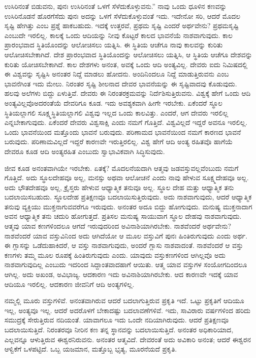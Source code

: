 ಉಸಿರಿನಂತೆ ಬಿಡುವನು, ಪುನಃ ಉಸಿರಿನಂತೆ ಒಳಗೆ ಸೆಳೆದುಕೊಳ್ಳುವನು.” ನಾವು ಒಂದು ಧೂಳಿನ ಕಣವನ್ನು ಉಸಿರಿನೊಡನೆ ಹೊರಗೆಸೆದು ಪುನಃ ಅದನ್ನು ಒಳಗೆ ಸೆಳೆದುಕೊಳ್ಳುವಂತೆ ಇದು. ಇದೇನೋ ಸರಿ, ಆದರೆ ಮೊದಲ ಸೃಷ್ಟಿ ಹೇಗಿತ್ತು ಎಂಬ ಪ್ರಶ್ನೆ ಹಾಕಬಹುದು. ಇದಕ್ಕೆ ಉತ್ತರವೆ, ಪ್ರಥಮ ಸೃಷ್ಟಿ ಎಂದರೆ ಅರ್ಥವೇನು? ಪ್ರಥಮಸೃಷ್ಟಿ ಎಂಬುದೇ ಇರಲಿಲ್ಲ. ಕಾಲಕ್ಕೆ ಒಂದು ಆದಿಯನ್ನು ನೀವು ಕೊಟ್ಟರೆ ಕಾಲದ ಭಾವನೆಯೆ ನಾಶವಾಗುವುದು. ಕಾಲ ಪ್ರಾರಂಭವಾದ ಸ್ಥಿತಿಯೊಂದನ್ನು ಆಲೋಚಿಸಲು ಯತ್ನಿಸಿ. ಈ ಸ್ಥಿತಿಯ ಆಚೆಗೂ ನಾವು ಕಾಲವನ್ನು ಕುರಿತು ಆಲೋಚಿಸಬೇಕಾಗಿದೆ. ದೇಶ ಪ್ರಾರಂಭವಾದ ಸ್ಥಿತಿಯೊಂದನ್ನು ಆಲೋಚಿಸಲು ಯತ್ನಿಸಿ, ಆ ಸ್ಥಿತಿಯ ಆಚೆಗೂ ದೇಶವನ್ನು ಕುರಿತು ಯೋಚಿಸಬೇಕಾಗಿದೆ. ಕಾಲ ದೇಶಗಳು ಅನಂತ, ಅವಕ್ಕೆ ಒಂದು ಆದಿ ಅಂತ್ಯವಿಲ್ಲ. ದೇವರು ಐದು ನಿಮಿಷದಲ್ಲಿ ಈ ವಿಶ್ವವನ್ನು ಸೃಷ್ಟಿಸಿ ಅನಂತರ ನಿದ್ದೆ ಮಾಡಲು ಹೋದನು. ಅಂದಿನಿಂದಲೂ ನಿದ್ದೆ ಮಾಡುತ್ತಿರುವನು ಎಂಬ ಭಾವನೆಗಿಂತ ಇದು ಮೇಲು. ನಿರಂತರ ಸೃಷ್ಟಿ ಶೀಲನಾದ ದೇವರ ಭಾವನೆಯನ್ನು ಈ ಸೃಷ್ಟಿವಾದವು ಕೊಡುವುದು. ಹಲವು ಅಲೆಗಳು ಬಿದ್ದು ಏಳುತ್ತಿವೆ. ದೇವರು ಈ ನಿರಂತರ\break ಕ್ರಮವನ್ನು ನಿರ್ದೆಶಿಸುತ್ತಿರುವನು. ವಿಶ್ವಕ್ಕೆ ಹೇಗೆ ಒಂದು ಆದಿ ಅಂತ್ಯವಿಲ್ಲವೊ\break ಅದರಂತೆಯೆ ದೇವರಿಗೂ ಕೂಡ. ಇದು ಅವಶ್ಯಕವಾಗಿ ಹೀಗೇ ಇರಬೇಕು. ಏಕೆಂದರೆ ಸ್ಥೂಲ ಸ್ಥಿತಿಯಲ್ಲಾಗಲಿ ಸೂಕ್ಷ್ಮಸ್ಥಿತಿಯಲ್ಲಾಗಲಿ ವಿಶ್ವವು ಇಲ್ಲದ ಒಂದು ಕಾಲವಿತ್ತು. ಎಂದರೆ, ಆಗ ದೇವರು ಇರಲಿಲ್ಲ ಎನ್ನಬೇಕಾಗುವುದು. ಏಕೆಂದರೆ ದೇವರು ವಿಶ್ವಸಾಕ್ಷಿ ಎಂದು ನಮಗೆ ಗೊತ್ತಿದೆ. ವಿಶ್ವವಿಲ್ಲದೆ ಇದ್ದರೆ ಅವನೂ ಇರಲಿಲ್ಲ. ಒಂದು ಭಾವನೆಯಿಂದ ಮತ್ತೊಂದು ಭಾವನೆ ಬರುವುದು. ಪರಿಣಾಮದ ಭಾವನೆಯಿಂದ ನಮಗೆ ಕಾರಣದ ಭಾವನೆ ಬರುವುದು. ಪರಿಣಾಮವಿಲ್ಲದೆ ಇದ್ದರೆ ಕಾರಣವೇ ಇರುತ್ತಿರಲಿಲ್ಲ. ವಿಶ್ವ ಹೇಗೆ ಆದಿ ಅಂತ್ಯ ರಹಿತವೊ ಹಾಗೆಯೆ ದೇವರೂ ಕೂಡ ಆದಿ ಅಂತ್ಯರಹಿತ ಎಂಬುದು ಸ್ವಾಭಾವಿಕವಾಗಿ ಸಿದ್ಧಿಸುವುದು.

ಜೀವ ಕೂಡ ಅನಂತವಾಗಿಯೇ ಇರಬೇಕು. ಏತಕ್ಕೆ? ಮೊದಲನೆಯದಾಗಿ ಆತ್ಮವು ಜಡವಸ್ತುವಲ್ಲವೆಂಬುದು ನಮಗೆ ಗೊತ್ತಿದೆ. ಅದು ಸ್ಥೂಲದೇಹವೂ ಅಲ್ಲ, ಮನಸ್ಸು ಅಥವಾ ಆಲೋಚನೆ ಎಂದು ನಾವು ಹೇಳುವ ಸೂಕ್ಷ್ಮದೇಹವೂ ಅಲ್ಲ. ಅದು ಭೌತದೇಹವೂ ಅಲ್ಲ, ಕ್ರೈಸ್ತರು ಹೇಳುವ ಆಧ್ಯಾತ್ಮಿಕ ತನುವೂ ಅಲ್ಲ. ಸ್ಥೂಲ ದೇಹ ಮತ್ತು ಆಧ್ಯಾತ್ಮಿಕ ತನು ಬದಲಾಯಿಸಬಹುದು. ಸ್ಥೂಲದೇಹ ಪ್ರತಿಕ್ಷಣವೂ ಬದಲಾಯಿಸುತ್ತಿರುವುದು. ಅದು ನಾಶವಾಗುವುದು, ಆದರೆ ಆಧ್ಯಾತ್ಮಿಕ ತನುವು ವ್ಯಕ್ತಿಯು ಮುಕ್ತನಾಗುವವರೆಗೂ ಇರುವುದು. ಅನಂತರ ಅದೂ ಬಿದ್ದು ಹೋಗುವುದು. ಮನುಷ್ಯ ಮುಕ್ತನಾದಾಗ ಅವನ ಆಧ್ಯಾತ್ಮಿಕ ತನು ಚದುರಿ ಹೋಗುತ್ತದೆ. ಪ್ರತಿಸಲ ಮನುಷ್ಯ ಸಾಯುವಾಗ ಸ್ಥೂಲ ದೇಹವು ನಾಶವಾಗುವುದು. ಆತ್ಮವು ಯಾವ ಕಣಗಳಿಂದಲೂ ಆಗದೆ ಇರುವುದರಿಂದ ಅವಿನಾಶಿಯಾಗಿರಬೇಕು. ನಾಶವೆಂದರೆ ಅರ್ಥವೇನು? ನಾಶವೆಂದರೆ ಯಾವ ವಸ್ತುವಿನಿಂದ ಅದು ಆಗಿದೆಯೋ ಆ ಮೂಲ ವಸ್ತುವಿಗೆ ಪುನಃ ಹಿಂತಿರುಗುವುದು ಎಂದು ಅರ್ಥ. ಈ ಗ್ಲಾಸನ್ನು ಒಡೆದುಹಾಕಿದರೆ, ಆ ವಸ್ತು ನಾಶವಾಗುವುದು, ಅಂದರೆ ಗ್ಲಾಸು ನಾಶವಾದಂತೆ. ನಾಶವೆಂದರೆ ಆ ವಸ್ತು ಕಣಗಳು ತಮ್ಮ ಮೂಲ ರೂಪಕ್ಕೆ ಹಿಂತಿರುಗುವುದು ಎಂದು. ಯಾವುದು ವಸ್ತುಕಣಗಳಿಂದ ಆಗಿಲ್ಲವೊ ಅದು ನಾಶವಾಗುವುದಿಲ್ಲ ಎಂಬುದು ಇದರಿಂದ ಸಿದ್ದಾಂತವಾದಹಾಗೆ ಆಯಿತು. ಆತ್ಮ ಯಾವ ವಸ್ತುಗಳ ಸಂಯೋಗದಿಂದಲೂ ಆಗಿಲ್ಲ. ಅದು ಅಖಂಡ, ಅವಿಭಾಜ್ಯ. ಆದಕಾರಣ ಇದು ಅವಿನಾಶಿಯಾಗಿರಬೇಕು. ಆದ ಕಾರಣವೇ ಇದಕ್ಕೆ ಯಾವ ಆದಿಯೂ ಇರಲಿಲ್ಲ. ಆದಕಾರಣ ಜೀವನಿಗೆ ಆದಿ ಅಂತ್ಯಗಳಿಲ್ಲ.

ನಮ್ಮಲ್ಲಿ ಮೂರು ವಸ್ತುಗಳಿವೆ. ಅನಂತವಾಗಿರುವ ಆದರೆ ಬದಲಾಗುತ್ತಿರುವ ಪ್ರಕೃತಿ ಇದೆ. ಒಟ್ಟು ಪ್ರಕೃತಿಗೆ ಆದಿಯೂ ಇಲ್ಲ, ಅಂತ್ಯವೂ ಇಲ್ಲ. ಆದರೆ ಅದರೊಳಗೆ ಬೇಕಾದಷ್ಟು ಬದಲಾವಣೆಗಳಿವೆ. ಇದು, ಸಾವಿರಾರು ವರ್ಷಗಳಿಂದ ಹರಿದು ಸಮುದ್ರಕ್ಕೆ ಸೇರುತ್ತಿರುವ ನದಿಯಂತೆ. ಯಾವಾಗಲೂ ಇದು ಒಂದೇ ನದಿಯಾಗಿರುವುದು. ಆದರೆ ಪ್ರತಿಕ್ಷಣವೂ ಬದಲಾಯಿಸುತ್ತಿದೆ. ನಿರಂತರವೂ ನೀರಿನ ಕಣ ತನ್ನ ಸ್ಥಾನವನ್ನು ಬದಲಾಯಿಸುತ್ತಿದೆ. ಅನಂತರ ಅಧಿಕಾರಿಯಾದ, ಎಲ್ಲವನ್ನೂ ಆಳುತ್ತಿರುವ ಈಶ್ವರನಿರುವನು. ಅನಂತರ ಆತ್ಮವಿದೆ. ದೇವರಂತೆ ಅದು ಅವಿಕಾರಿ ಅನಂತ; ಆದರೆ ಈಶ್ವರನ ಆಳ್ವಿಕೆಗೆ ಒಳಪಟ್ಟಿದೆ. ಒಬ್ಬ ಯಜಮಾನ, ಮತ್ತೊಬ್ಬ ಭೃತ್ಯ, ಮೂರನೆಯದೆ ಪ್ರಕೃತಿ.

